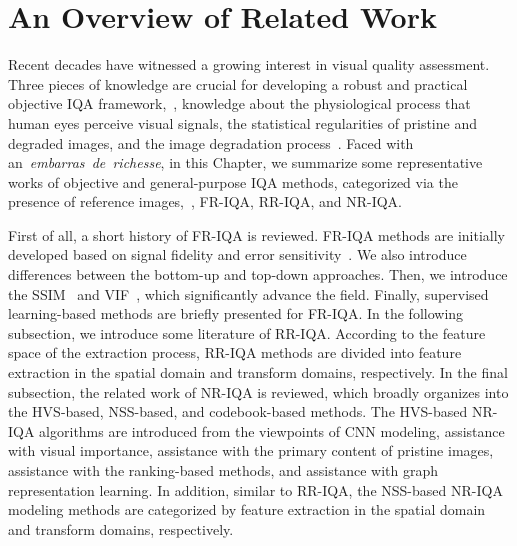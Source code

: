 \chapter{An Overview of Related Work}\label{chap:related_work}
\graphicspath{{Chapter2/}}

Recent decades have witnessed a growing interest in visual quality assessment. Three pieces of knowledge are crucial for developing a robust and practical objective IQA framework,~\ie, knowledge about the physiological process that human eyes perceive visual signals, the statistical regularities of pristine and degraded images, and the image degradation process~\citep{wang2011reduced}. Faced with an~\emph{embarras~de~richesse}, in this Chapter, we summarize some representative works of objective and general-purpose IQA methods, categorized via the presence of reference images,~\ie, FR-IQA, RR-IQA, and NR-IQA.

First of all, a short history of FR-IQA is reviewed. FR-IQA methods are initially developed based on signal fidelity and error sensitivity~\citep{wang2006modern}. We also introduce differences between the bottom-up and top-down approaches. Then, we introduce the SSIM~\citep{wang2004image} and VIF~\citep{sheikh2006image}, which significantly advance the field. Finally, supervised learning-based methods are briefly presented for FR-IQA. In the following subsection, we introduce some literature of RR-IQA. According to the feature space of the extraction process, RR-IQA methods are divided into feature extraction in the spatial domain and transform domains, respectively. In the final subsection, the related work of NR-IQA is reviewed, which broadly organizes into the HVS-based, NSS-based, and codebook-based methods. The HVS-based NR-IQA algorithms are introduced from the viewpoints of CNN modeling, assistance with visual importance, assistance with the primary content of pristine images, assistance with the ranking-based methods, and assistance with graph representation learning. In addition, similar to RR-IQA, the NSS-based NR-IQA modeling methods are categorized by feature extraction in the spatial domain and transform domains, respectively.


